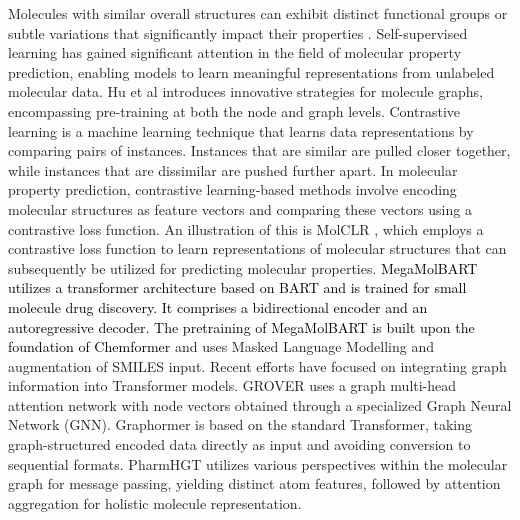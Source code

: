 \documentclass[sigconf,nonacm]{acmart}
\begin{document}
Molecules with similar overall structures can exhibit distinct functional groups or subtle variations that significantly impact their properties \cite{Pelzer2016}. Self-supervised learning has gained significant attention in the field of molecular property prediction, enabling models to learn meaningful representations from unlabeled molecular data.
Hu et al \cite{DBLP:conf/iclr/HuLGZLPL20} introduces innovative strategies for molecule graphs, encompassing pre-training at both the node and graph levels. 
Contrastive learning \cite{pmlr-v119-chen20j,oord2019representation} is a machine learning technique that learns data representations by comparing pairs of instances. Instances that are similar are pulled closer together, while instances that are dissimilar are pushed further apart. In molecular property prediction, contrastive learning-based methods involve encoding molecular structures as feature vectors and comparing these vectors using a contrastive loss function. An illustration of this is MolCLR \cite{Wang_2022}, which employs a contrastive loss function to learn representations of molecular structures that can subsequently be utilized for predicting molecular properties.
\textcolor{black}{MegaMolBART utilizes a transformer architecture based on BART \cite{lewis2020bart} and is trained for small molecule drug discovery. It comprises a bidirectional encoder and an autoregressive decoder. The pretraining of MegaMolBART is built upon the foundation of Chemformer \cite{Irwin_2022}} and uses Masked Language Modelling and augmentation of SMILES input. Recent efforts have focused on integrating graph information into Transformer models. GROVER \cite{DBLP:conf/nips/RongBXX0HH20} uses a graph multi-head attention network with node vectors obtained through a specialized Graph Neural Network (GNN). Graphormer \cite{ying2021do} is based on the standard Transformer, taking graph-structured encoded data directly as input and avoiding conversion to sequential formats. PharmHGT \cite{Jiang2023} utilizes various perspectives within the molecular graph for message passing, yielding distinct atom features, followed by attention aggregation for holistic molecule representation.
\end{document}
